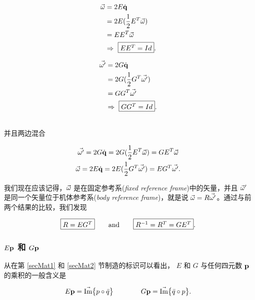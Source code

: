 \begin{minipage}[left]{0.49 \textwidth}
	\begin{align*}
		\vec{\omega} &= 2E\dot{\mathbf{q}}   \\
		         &= 2E(\frac{1}{2} E^T\vec{\omega})   \\
		         &= EE^T \vec{\omega}   \\
		&\Rightarrow \ \fbox{$EE^T = Id$} .
	\end{align*}
\end{minipage}
\begin{minipage}[right]{0.49 \textwidth}
	\begin{align*}
		\vec{\omega'} &= 2G\dot{\mathbf{q}}   \\
		         &= 2G(\frac{1}{2} G^T\vec{\omega'})   \\
		         &= GG^T \vec{\omega'}   \\
		&\Rightarrow \ \fbox{$GG^T = Id$} .
	\end{align*}
\end{minipage} \\


并且两边混合

\begin{gather*}
	\vec{\omega'} = 2G\dot{\mathbf{q}} = 2G(\frac{1}{2} E^T\vec{\omega}) = GE^T \vec{\omega} \\
	\vec{\omega} = 2E\dot{\mathbf{q}} = 2E(\frac{1}{2} G^T\vec{\omega'}) = EG^T \vec{\omega'} .
\end{gather*}


我们现在应该记得，$\vec{\omega}$ 是在固定参考系(\emph{fixed reference frame})中的矢量，并且 $\vec{\omega}'$ 是同一个矢量位于机体参考系(\emph{body reference frame})，就是说 $\vec{\omega} = R \vec{\omega'}$。通过与前两个结果的比较，我们发现

\begin{equation}
\fbox{$ R = EG^T $} \qquad \textrm{and} \qquad \fbox{$R^{-1}=R^T=GE^T $} .
\label{eqRot}
\end{equation}








\subsubsection{$E\mathbf{p}$ 和 $G\mathbf{p}$}

从在第 \ref{secMat1} 和 \ref{secMat2} 节制造的标识可以看出， $E$ 和 $G$ 与任何四元数 $\mathbf{p}$ 的乘积的一般含义是

\begin{equation}
E\mathbf{p} = \vec{\textrm{Im}}\big\{{p \circ \bar{q}}\big\}    \qquad \qquad    G\mathbf{p} = \vec{\textrm{Im}}\big\{{\bar{q} \circ p} \big\} .
\label{eqEpGp}
\end{equation}

